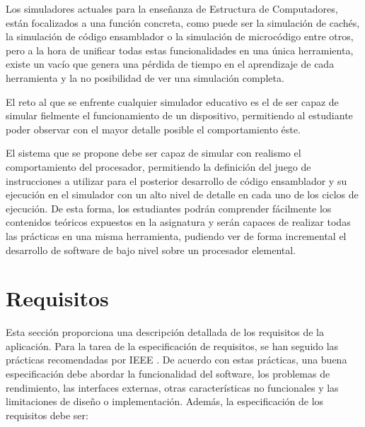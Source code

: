 Los simuladores actuales para la enseñanza de Estructura de Computadores, están focalizados a una función concreta, como puede ser la simulación de cachés, la simulación de código ensamblador o la simulación de microcódigo entre otros, pero a la hora de unificar todas estas funcionalidades en una única herramienta, existe un vacío que genera una pérdida de tiempo en el aprendizaje de cada herramienta y la no posibilidad de ver una simulación completa.

El reto al que se enfrente cualquier simulador educativo es el de ser capaz de simular fielmente el funcionamiento de un dispositivo, permitiendo al estudiante poder observar con el mayor detalle posible el comportamiento éste.

El sistema que se propone debe ser capaz de simular con realismo el comportamiento del procesador, permitiendo la definición del juego de instrucciones a utilizar para el posterior desarrollo de código ensamblador y su ejecución en el simulador con un alto nivel de detalle en cada uno de los ciclos de ejecución. De esta forma, los estudiantes podrán comprender fácilmente los contenidos teóricos expuestos en la asignatura y serán capaces de realizar todas las prácticas en una misma herramienta, pudiendo ver de forma incremental el desarrollo de software de bajo nivel sobre un procesador elemental.


\section{Requisitos}
\label{sec:requirements}

Esta sección proporciona una descripción detallada de los requisitos de la aplicación. Para la tarea de la especificación de requisitos, se han seguido las prácticas recomendadas por IEEE \cite{ieee1998}. De acuerdo con estas prácticas, una buena especificación debe abordar la funcionalidad del software, los problemas de rendimiento, las interfaces externas, otras características no funcionales y las limitaciones de diseño o implementación.
Además, la especificación de los requisitos debe ser:

